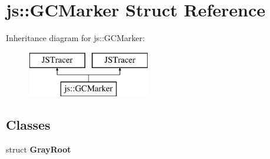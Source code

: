 \hypertarget{structjs_1_1_g_c_marker}{\section{js\-:\-:G\-C\-Marker Struct Reference}
\label{structjs_1_1_g_c_marker}
}
Inheritance diagram for js\-:\-:G\-C\-Marker\-:\begin{figure}[H]
\begin{center}
\leavevmode
\includegraphics[height=2.000000cm]{structjs_1_1_g_c_marker}
\end{center}
\end{figure}
\subsection*{Classes}
\begin{DoxyCompactItemize}
\item 
struct {\bfseries Gray\-Root}
\end{DoxyCompactItemize}
